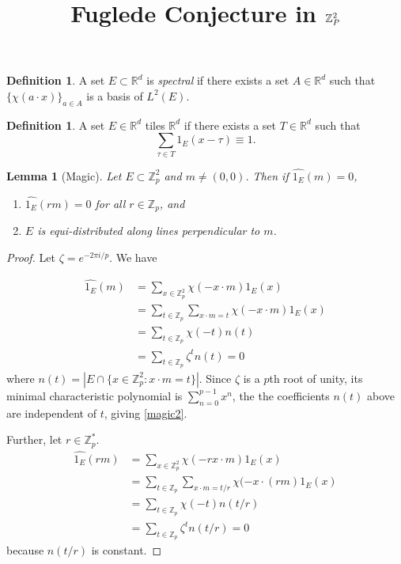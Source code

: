 \documentclass[12pt]{article}
\title{Fuglede Conjecture in $\bbZ_P^2$}
\newcommand{\bbR}{\mathbb{R}}
\newcommand{\bbZ}{\mathbb{Z}}
\newtheorem{lemma}[theorem]{Lemma}
\theoremstyle{definition}
\newtheorem{definition}[theorem]{Definition}
\numberwithin{equation}{subsection}
\begin{document}
\pagestyle{plain}



\maketitle

\begin{definition}
    A set $E\subset{\bbR^d}$ is \emph{spectral} if there exists a set $A\in \bbR^d$ such that $\{\chi(a\cdot x)\}_{a\in A}$ is a basis of $L^2(E)$.
\end{definition}


\begin{definition}
    A set $E\in \bbR^d$ tiles $\bbR^d$ if there exists a set $T\in \bbR^d$ such that \[
        \sum_{\tau \in T} 1_E(x-\tau) \equiv 1.    
    \]
\end{definition}

\begin{lemma}[Magic]\label{magic}
    Let $E\subset \bbZ_p^2$  and $m\neq (0,0)$. Then if $\hat{1_E}(m)=0$, 
    \begin{enumerate}[label=(\roman*)]
        \item $\hat{1_E}(r m) =0$ for all $r\in \bbZ_p$, and
        \item\label{magic2} $E$ is equi-distributed along lines perpendicular to $m$. 
    \end{enumerate}
\end{lemma}

\begin{proof}
    Let $\zeta = e^{-2\pi i/p}$. We have 
    
    \begin{align*}
        \hat{1_E}(m) &= \sum_{x\in \bbZ_p^2} \chi(-x\cdot m)1_E(x) \\
        \ &= \sum_{t\in \bbZ_p}\sum_{x\cdot m = t} \chi(-x\cdot m)1_E(x)  \\ 
        \ &= \sum_{t\in \bbZ_p}\chi(-t)n(t)  \\ 
        \ &= \sum_{t\in \bbZ_p}\zeta^t n(t) =0
    \end{align*} where $n(t) = |E \cap \{x \in \bbZ_p^2 : x\cdot m = t\}| $. Since $\zeta$ is a $p$th root of unity, its minimal characteristic polynomial is $\sum_{n=0}^{p-1} x^n $, the the coefficients $n(t)$ above are independent of $t$, giving \ref{magic2}.   

    Further, let $r\in \bbZ_p^*$.
    \begin{align*}
        \hat{1_E}(r m) &= \sum_{x\in \bbZ_p^2} \chi(- r x\cdot m)1_E(x) \\
        \ &= \sum_{t\in \bbZ_p}\sum_{x\cdot m = t/r} \chi(-x\cdot (r m)1_E(x)  \\ 
        \ &= \sum_{t\in \bbZ_p}\chi(-t)n(t/r)  \\ 
        \ &= \sum_{t\in \bbZ_p}\zeta^t n(t/r) =0
    \end{align*} because $n(t/r)$ is constant.
\end{proof}
\end{document}
